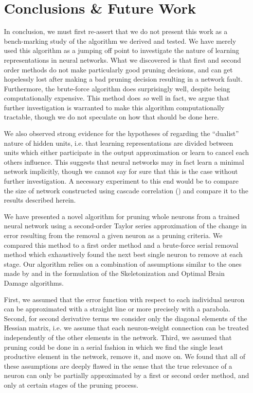 \section{Conclusions \& Future Work}
In conclusion, we must first re-assert that we do not present this work as a bench-marking study of the algorithm we derived and tested. We have merely used this algorithm as a jumping off point to investigate the nature of learning representations in neural networks. What we discovered is that first and second order methods do not make particularly good pruning decisions, and can get hopelessly lost after making a bad pruning decision resulting in a network fault. Furthermore, the brute-force algorithm does surprisingly well, despite being computationally expensive. This method does \textit{so} well in fact, we argue that further investigation is warranted to make this algorithm computationally tractable, though we do not speculate on how that should be done here. 

We also observed strong evidence for the hypotheses of \cite{mozer1989skeletonization} regarding the ``dualist'' nature of hidden units, i.e. that learning representations are divided between units which either participate in the output approximation or learn to cancel each others influence. This suggests that neural networks may in fact learn a minimal network implicitly, though we cannot say for sure that this is the case without further investigation. A necessary experiment to this end would be to compare the size of network constructed using cascade correlation (\cite{fahlman1989cascade}) and compare it to the results described herein. 

We have presented a novel algorithm for pruning whole neurons from a trained neural network using a second-order Taylor series approximation of the change in error resulting from the removal a given neuron as a pruning criteria. We compared this method to a first order method and a brute-force serial removal method which exhaustively found the next best single neuron to remove at each stage. Our algorithm relies on a combination of assumptions similar to the ones made by \cite{mozer1989skeletonization} and \cite{lecun1989optimal} in the formulation of the Skeletonization and Optimal Brain Damage algorithms. 

First, we assumed that the error function with respect to each individual neuron can be approximated with a straight line or more precisely with a parabola. Second, for second derivative terms we consider only the diagonal elements of the Hessian matrix, i.e. we assume that each neuron-weight connection can be treated independently of the other elements in the network. Third, we assumed that pruning could be done in a serial fashion in which we find the single least productive element in the network, remove it, and move on. We found that all of these assumptions are deeply flawed in the sense that the true relevance of a neuron can only be partially approximated by a first or second order method, and only at certain stages of the pruning process. 

